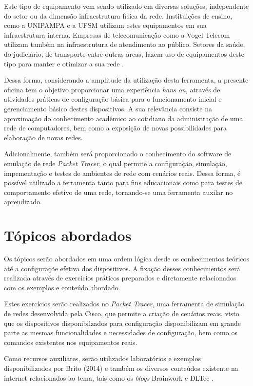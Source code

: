 \documentclass[12pt]{article}
\begin{document}
Este tipo de equipamento vem sendo utilizado em diversas soluções, independente do setor ou da dimensão infraestrutura física da rede. Instituições de ensino, como a UNIPAMPA e a UFSM utilizam estes equipamentos em sua infraestrutura interna. Empresas de telecomunicação como a Vogel Telecom utilizam também na infraestrutura de atendimento ao público. Setores da saúde, do judiciário, de transporte entre outras áreas, fazem uso de equipamentos deste tipo para manter e otimizar a sua rede \cite{cisco:19}.

Dessa forma, considerando a amplitude da utilização desta ferramenta, a presente oficina tem o objetivo proporcionar uma experiência \textit{hans on}, através de atividades práticas de configuração básica para o funcionamento inicial e gerenciamento básico destes dispositivos. A sua  relevância consiste na aproximação do conhecimento acadêmico ao cotidiano da administração de uma rede de computadores, bem como a exposição de novas possibilidades para elaboração de novas redes.  

Adicionalmente, também será proporcionado o conhecimento do software  de  emulação de rede \textit{Packet Tracer}, o qual permite a configuração, simulação, impementação e testes de ambientes de rede com cenários reais. Dessa forma, é possível utilizado a ferramenta tanto para fins educacionais como para testes de comportamento efetivo de uma rede, tornando-se uma ferramenta auxilar no aprendizado.

\section{Tópicos abordados} \label{sec:topicosabordados}

Os tópicos serão abordados em uma ordem lógica desde os conhecimentos teóricos até a configuraçõe efetiva dos dispositivos. A fixação desses conhecimentos será realizada através de exercícios práticos preparados e diretamente relacionados com os exemplos e conteúdo abordado. 

Estes exercícios serão realizados no \textit{Packet Tracer}, uma ferramenta de simulação de redes desenvolvida pela Cisco, que permite a criação de cenários reais, visto que os dispositivos disponibilzados para configuração disponibilizam em grande parte as mesmas funcionalidades e necessidades de configuração, bem como os comandos existentes nos equipamentos reais. 

Como recursos auxiliares, serão  utilizados laboratórios e exemplos disponibilizados por Brito (2014) e
\nocite{brito:14} também os diversos conteúdos existente na internet relacionados ao tema, tais como os
\textit{blogs} Brainwork \nocite{brainwork} e DLTec \nocite{dltec}.
\end{document}
